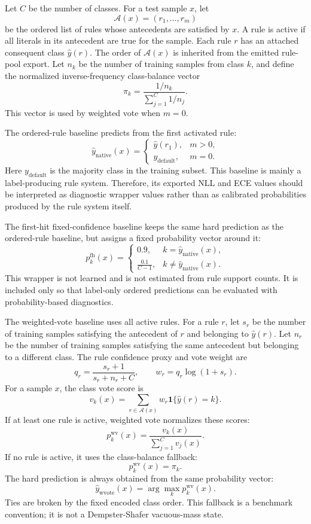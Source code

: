 \documentclass[conference]{IEEEtran}
\begin{document}
Let $C$ be the number of classes. For a test sample $x$, let
\[
  \mathcal{A}(x)=(r_1,\ldots,r_m)
\]
be the ordered list of rules whose antecedents are satisfied by $x$. A rule is active if all literals in its antecedent are true for the sample. Each rule $r$ has an attached consequent class $\hat{y}(r)$. The order of $\mathcal{A}(x)$ is inherited from the emitted rule-pool export. Let $n_k$ be the number of training samples from class $k$, and define the normalized inverse-frequency class-balance vector
\[
  \pi_k=\frac{1/n_k}{\sum_{j=1}^{C}1/n_j}.
\]
This vector is used by weighted vote when $m=0$.

The ordered-rule baseline predicts from the first activated rule:
\[
  \hat{y}_{\mathrm{native}}(x)=
  \begin{cases}
    \hat{y}(r_1), & m>0,\\
    y_{\mathrm{default}}, & m=0.
  \end{cases}
\]
Here $y_{\mathrm{default}}$ is the majority class in the training subset. This baseline is mainly a label-producing rule system. Therefore, its exported NLL and ECE values should be interpreted as diagnostic wrapper values rather than as calibrated probabilities produced by the rule system itself.

The first-hit fixed-confidence baseline keeps the same hard prediction as the ordered-rule baseline, but assigns a fixed probability vector around it:
\[
  p^{\mathrm{fh}}_k(x)=
  \begin{cases}
    0.9, & k=\hat{y}_{\mathrm{native}}(x),\\
    \frac{0.1}{C-1}, & k\neq\hat{y}_{\mathrm{native}}(x).
  \end{cases}
\]
This wrapper is not learned and is not estimated from rule support counts. It is included only so that label-only ordered predictions can be evaluated with probability-based diagnostics.

The weighted-vote baseline uses all active rules. For a rule $r$, let $s_r$ be the number of training samples satisfying the antecedent of $r$ and belonging to $\hat{y}(r)$. Let $n_r$ be the number of training samples satisfying the same antecedent but belonging to a different class. The rule confidence proxy and vote weight are
\[
  q_r=\frac{s_r+1}{s_r+n_r+C},
  \qquad
  w_r=q_r\log(1+s_r).
\]
For a sample $x$, the class vote score is
\[
  v_k(x)=\sum_{r\in\mathcal{A}(x)}
  w_r\mathbf{1}\{\hat{y}(r)=k\}.
\]
If at least one rule is active, weighted vote normalizes these scores:
\[
  p^{\mathrm{wv}}_k(x)=\frac{v_k(x)}{\sum_{j=1}^{C}v_j(x)}.
\]
If no rule is active, it uses the class-balance fallback:
\[
  p^{\mathrm{wv}}_k(x)=\pi_k.
\]
The hard prediction is always obtained from the same probability vector:
\[
  \hat{y}_{\mathrm{wvote}}(x)=\arg\max_k p^{\mathrm{wv}}_k(x).
\]
Ties are broken by the fixed encoded class order. This fallback is a benchmark convention; it is not a Dempster-Shafer vacuous-mass state.
\end{document}

